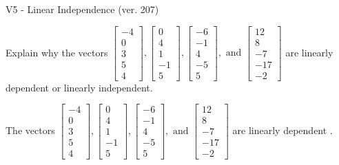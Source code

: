 \begin{exercise}
  \begin{exerciseTitle}V5 - Linear Independence (ver. 207)\end{exerciseTitle}
  \begin{exerciseStatement}
    Explain why the vectors \(\left[\begin{array}{r}
-4 \\
0 \\
3 \\
5 \\
4
\end{array}\right] , \left[\begin{array}{r}
0 \\
4 \\
1 \\
-1 \\
5
\end{array}\right] , \left[\begin{array}{r}
-6 \\
-1 \\
4 \\
-5 \\
5
\end{array}\right] , \text{ and } \left[\begin{array}{r}
12 \\
8 \\
-7 \\
-17 \\
-2
\end{array}\right]\) are linearly dependent or linearly independent.	


  \end{exerciseStatement}
  \begin{exerciseAnswer}
   The vectors \(\left[\begin{array}{r}
-4 \\
0 \\
3 \\
5 \\
4
\end{array}\right] , \left[\begin{array}{r}
0 \\
4 \\
1 \\
-1 \\
5
\end{array}\right] , \left[\begin{array}{r}
-6 \\
-1 \\
4 \\
-5 \\
5
\end{array}\right] , \text{ and } \left[\begin{array}{r}
12 \\
8 \\
-7 \\
-17 \\
-2
\end{array}\right]\) are 
  	 linearly dependent  .
  


  \end{exerciseAnswer}
\end{exercise}